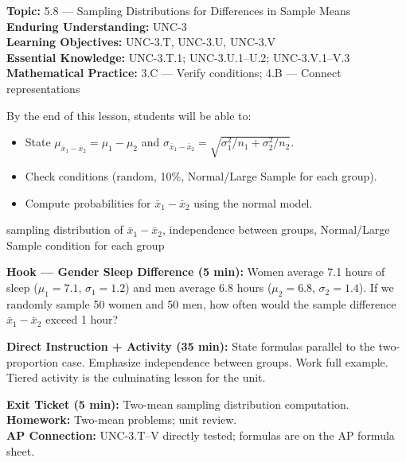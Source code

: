 \documentclass[10pt]{article}
\begin{document}

\begin{objectivebox}
\textbf{Topic:} 5.8 --- Sampling Distributions for Differences in Sample Means\\
\textbf{Enduring Understanding:} UNC-3\\
\textbf{Learning Objectives:} UNC-3.T, UNC-3.U, UNC-3.V\\
\textbf{Essential Knowledge:} UNC-3.T.1; UNC-3.U.1--U.2; UNC-3.V.1--V.3\\
\textbf{Mathematical Practice:} 3.C --- Verify conditions; 4.B --- Connect representations
\end{objectivebox}

\begin{learningtargetbox}
By the end of this lesson, students will be able to:
\begin{itemize}
  \item State $\mu_{\bar{x}_1-\bar{x}_2} = \mu_1 - \mu_2$ and
        $\sigma_{\bar{x}_1-\bar{x}_2} = \sqrt{\sigma_1^2/n_1 + \sigma_2^2/n_2}$.
  \item Check conditions (random, 10\%, Normal/Large Sample for each group).
  \item Compute probabilities for $\bar{x}_1 - \bar{x}_2$ using the normal model.
\end{itemize}
\end{learningtargetbox}

\begin{vocabbox}
sampling distribution of $\bar{x}_1 - \bar{x}_2$, independence between groups, Normal/Large Sample condition for each group
\end{vocabbox}

\begin{hookbox}
\textbf{Hook --- Gender Sleep Difference (5 min):} Women average 7.1 hours of sleep
($\mu_1 = 7.1$, $\sigma_1 = 1.2$) and men average 6.8 hours ($\mu_2 = 6.8$,
$\sigma_2 = 1.4$). If we randomly sample 50 women and 50 men, how often would the
sample difference $\bar{x}_1 - \bar{x}_2$ exceed 1 hour?
\end{hookbox}

\begin{notesbox}
\textbf{Direct Instruction + Activity (35 min):} State formulas parallel to the two-proportion
case. Emphasize independence between groups. Work full example. Tiered activity is the
culminating lesson for the unit.
\end{notesbox}

\begin{reflectionbox}
\textbf{Exit Ticket (5 min):} Two-mean sampling distribution computation.\\
\textbf{Homework:} Two-mean problems; unit review.\\
\textbf{AP Connection:} UNC-3.T--V directly tested; formulas are on the AP formula sheet.
\end{reflectionbox}
\end{document}
